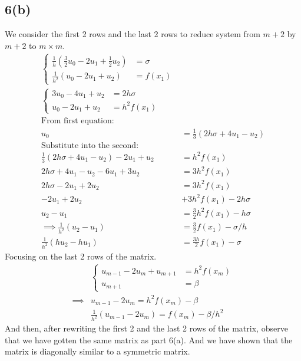 \documentclass[]{article}
\begin{document}
    \subsection*{6(b)}
        We consider the first 2 rows and the last 2 rows to reduce system from $m+2$ by $m + 2$ to $m \times m$. 
        \begin{align*}\tag{6.b.1}\label{eqn:6.b.1}
            \begin{cases}
                \frac{1}{h}\left(
                    \frac{3}{2}u_0 - 2u_1 + \frac{1}{2}u_2
                \right) &= \sigma
                \\
                \frac{1}{h^2}\left(
                    u_0 - 2u_1 + u_2
                \right) &= f(x_1)
            \end{cases}
            \\
            \begin{cases}
                3u_0 - 4u_1 + u_2 &= 2h\sigma 
                \\
                u_0 - 2u_1 + u_2 &= h^2 f(x_1)
            \end{cases}
            \\
            \text{From first }\text{equation: }& 
            \\
            u_0 &= \frac{1}{3}(2h\sigma + 4u_1 - u_2)
            \\
            \text{Substitute into the second: }& 
            \\
            \frac{1}{3}(2h\sigma + 4u_1 - u_2) - 2u_1 + u_2 &= h^2 f(x_1)
            \\
            2h\sigma + 4u_1 - u_2 - 6u_1 + 3u_2 &= 3h^2f(x_1)
            \\
            2h\sigma - 2u_1 + 2u_2 &= 3h^2f(x_1)
            \\
            -2u_1 + 2u_2 &+ 3h^2f(x_1) - 2h\sigma
            \\
            u_2 - u_1 &= \frac{3}{2}h^2f(x_1) - h\sigma 
            \\
            \implies 
            \frac{1}{h^2}(u_2 - u_1) &= \frac{3}{2}f(x_1) - \sigma/h
            \\
            \frac{1}{h^2}(hu_2 - hu_1) &= \frac{3h}{2}f(x_1) - \sigma
        \end{align*}
        Focusing on the last 2 rows of the matrix. 
        \begin{align*}\tag{6.b.2}\label{eqn:6.b.2}
            & \begin{cases}
                u_{m - 1} - 2u_m + u_{m + 1} &= h^2f(x_m)
                \\
                u_{m + 1} &= \beta    
            \end{cases}
            \\
            \implies
            & u_{m - 1} - 2u_m = h^2f(x_m) - \beta
            \\
            & 
            \frac{1}{h^2}(u_{m - 1} - 2u_m) = 
            f(x_m) - \beta/h^2
        \end{align*}
        And then, after rewriting the first 2 and the last 2 rows of the matrix, observe that we have gotten the same matrix as part 6(a). And we have shown that the matrix is diagonally similar to a symmetric matrix. 

    
\end{document}
